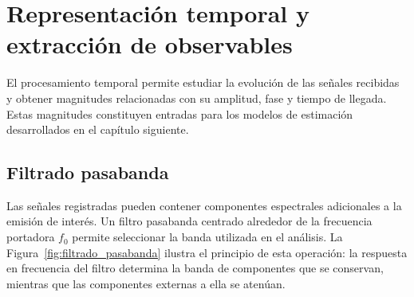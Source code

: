 \section{Representación temporal y extracción de observables}

El procesamiento temporal permite estudiar la evolución de las señales
recibidas y obtener magnitudes relacionadas con su amplitud, fase y
tiempo de llegada. Estas magnitudes constituyen entradas para los modelos
de estimación desarrollados en el capítulo siguiente.



\subsection*{Filtrado pasabanda}

Las señales registradas pueden contener componentes espectrales
adicionales a la emisión de interés. Un filtro pasabanda centrado
alrededor de la frecuencia portadora $f_0$ permite seleccionar la
banda utilizada en el análisis. La Figura~\ref{fig:filtrado_pasabanda} ilustra el
principio de esta operación: la respuesta en frecuencia del filtro
determina la banda de componentes que se conservan, mientras que las
componentes externas a ella se atenúan.


